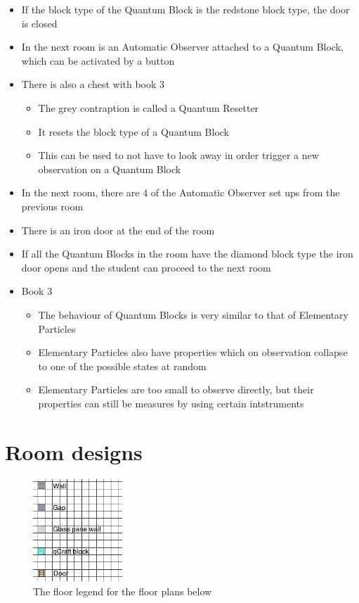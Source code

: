\documentclass[11pt,twoside]{report} %
\begin{document}
\begin{itemize}
	\item If the block type of the Quantum Block is the redstone block type, the door is closed
	\item In the next room is an Automatic Observer attached to a Quantum Block, which can be activated by a button
	\item There is also a chest with book 3
	\begin{itemize}
		\item The grey contraption is called a Quantum Resetter
		\item It resets the block type of a Quantum Block
		\item This can be used to not have to look away in order trigger a new observation on a Quantum Block
	\end{itemize}
	\item In the next room, there are 4 of the Automatic Observer set ups from the previous room
	\item There is an iron door at the end of the room
	\item If all the Quantum Blocks in the room have the diamond block type the iron door opens and the student can proceed to the next room
	\item Book 3
	\begin{itemize}
		\item The behaviour of Quantum Blocks is very similar to that of Elementary Particles
		\item Elementary Particles also have properties which on observation collapse to one of the possible states at random
		\item Elementary Particles are too small to observe directly, but their properties can still be measures by using certain intstruments
	\end{itemize}
\end{itemize}

\newpage

\section{Room designs}

\begin{figure}[h!]
\centering
\includegraphics[width=0.3\textwidth]{legend}
\caption{The floor legend for the floor plans below}
\label{fig:legend}
\end{figure}
\end{document}
